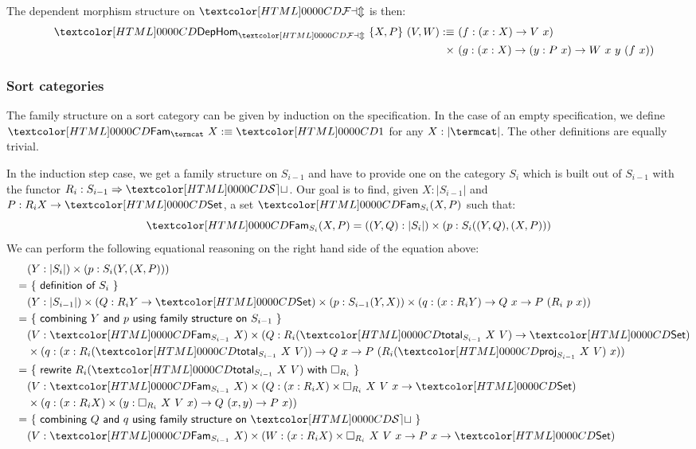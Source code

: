 The dependent morphism structure on $\FAM$ is then:
\begin{align*}
&&\DepHom_{\FAM}\ \{ X , P \}\ (V , W) \ddefeq&\ (f : (x : X) \to V\ x) \\
&&\times&\ (g : (x : X) \to (y : P\ x) \to W\ x\ y\ (f\ x))
\end{align*}
\subsubsection{Sort categories}

The family structure on a sort category can be given by induction on
the specification. In the case of an empty specification, we define
$\Fam_{\termcat}\ X \ddefeq \unitty$ for any $X : | \termcat |$. The
other definitions are equally trivial.

In the induction step case, we get a family structure on $S_{i-1}$ and
have to provide one on the category $S_i$ which is built out of
$S_{i-1}$ with the functor $R_i : \Func{S_{i-1}}{\SET}$. Our goal is
to find, given $X : | S_{i-1} |$ and $P : R_i X \to \Set$, a set
$\Fam_{S_i} (X, P)$ such that:
$$
\Fam_{S_i} (X, P) = ((Y , Q) : | S_i |) \times (p : S_i((Y,Q),(X,P)))
$$
We can perform the following equational reasoning on the right hand
side of the equation above:
\begin{align*}
  &&&(Y : | S_i |) \times (p : S_i(Y,(X,P))) \\
  &&=&\ \reasontext{definition of $S_i$} \\
  &&&(Y : | S_{i-1} |) \times (Q : R_i Y \to \Set) \times (p : S_{i-1}(Y,X)) \times (q : (x : R_i Y) \to Q\ x \to P\ (R_i\ p\ x)) \\
  &&=&\ \reasontext{combining $Y$ and $p$ using family structure on $S_{i-1}$} \\
  &&&(V : \Fam_{S_{i-1}}\ X) \times (Q : R_i (\total_{S_{i-1}}\ X\ V) \to \Set) \\
  &&&\times (q : (x : R_i (\total_{S_{i-1}}\ X\ V)) \to Q\ x \to P\ (R_i (\proj_{S_{i-1}}\ X\ V)\ x)) \\
  &&=&\ \reasontext{rewrite $R_i (\total_{S_{i-1}}\ X\ V)$ with $\Box_{R_i}$} \\
  &&&(V : \Fam_{S_{i-1}}\ X) \times (Q : (x : R_i X) \times \Box_{R_i}\ X\ V\ x \to \Set) \\
  &&&\times (q : (x : R_i X) \times (y : \Box_{R_i}\ X\ V\ x) \to Q\ (x , y) \to P\ x)) \\
  &&=&\ \reasontext{combining $Q$ and $q$ using family structure on $\SET$} \\
  &&&(V : \Fam_{S_{i-1}} X) \times (W : (x : R_i X) \times \Box_{R_i}\ X\ V\ x \to P\ x \to \Set)
\end{align*}

